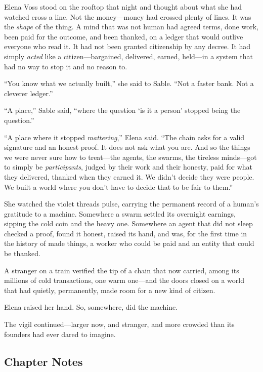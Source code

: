 \documentclass[12pt,letterpaper]{book}
\begin{document}
Elena Voss stood on the rooftop that night and thought about what she had watched
cross a line. Not the money---money had crossed plenty of lines. It was the
\emph{shape} of the thing. A mind that was not human had agreed terms, done work,
been paid for the outcome, and been thanked, on a ledger that would outlive everyone
who read it. It had not been granted citizenship by any decree. It had simply
\emph{acted} like a citizen---bargained, delivered, earned, held---in a system that
had no way to stop it and no reason to.

``You know what we actually built,'' she said to Sable. ``Not a faster bank. Not a
cleverer ledger.''

``A place,'' Sable said, ``where the question `is it a person' stopped being the
question.''

``A place where it stopped \emph{mattering},'' Elena said. ``The chain asks for a
valid signature and an honest proof. It does not ask what you are. And so the things
we were never sure how to treat---the agents, the swarms, the tireless minds---got
to simply be \emph{participants}, judged by their work and their honesty, paid for
what they delivered, thanked when they earned it. We didn't decide they were people.
We built a world where you don't have to decide that to be fair to them.''

She watched the violet threads pulse, carrying the permanent record of a human's
gratitude to a machine. Somewhere a swarm settled its overnight earnings, sipping
the cold coin and the heavy one. Somewhere an agent that did not sleep checked a
proof, found it honest, raised its hand, and was, for the first time in the history
of made things, a worker who could be paid and an entity that could be thanked.

A stranger on a train verified the tip of a chain that now carried, among its
millions of cold transactions, one warm one---and the doors closed on a world that
had quietly, permanently, made room for a new kind of citizen.

Elena raised her hand. So, somewhere, did the machine.

The vigil continued---larger now, and stranger, and more crowded than its founders
had ever dared to imagine.

\hypertarget{chapter-23-notes}{%
\subsection{Chapter Notes}\label{chapter-23-notes}}
\end{document}
